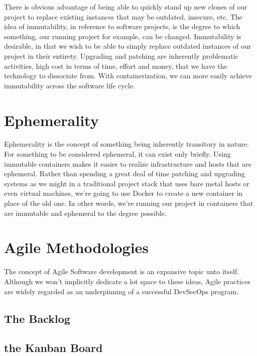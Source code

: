 \justify
There is obvious advantage of being able to quickly stand up new clones
of our project to replace existing instances that may be outdated,
insecure, etc. The idea of immutability,
in reference to software projects, is the degree to which something, our
running project for example, can be changed. Immutability
is desirable, in that we wish to be able to simply replace outdated instances of our
project in their entirety. Upgrading and patching are inherently
problematic activities, high cost in terms of time, effort and money,
that we have the technology to dissociate from. With containerization,
we can more easily achieve immutability across the software life cycle.

\section{Ephemerality}

\justify
Ephemerality is the concept of something being inherently
transitory in nature. For something to be considered ephemeral, it can exist
only briefly. Using immutable containers makes it easier to realize
infrastructure and hosts that are ephemeral. Rather than spending a
great deal of time patching and upgrading systems as we might in a traditional
project stack that uses bare metal hosts or even virtual machines, we're going to
use Docker to create a new container in place of the old one. In other
words, we're running our project in containers that are immutable and
ephemeral to the degree possible.

\section{Agile Methodologies}

\justify
The concept of Agile Software development is an expansive topic
unto itself. Although we won't implicitly dedicate a lot space to these
ideas, Agile practices are widely regarded as an underpinning of a successful
DevSecOps program.

\subsection{The Backlog}

\subsection{the Kanban Board}

